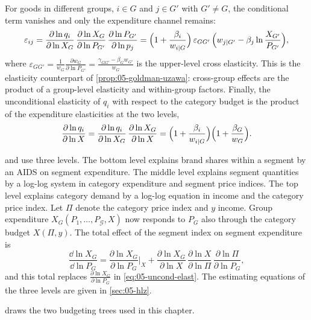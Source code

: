 For goods in different groups, $i \in G$ and $j \in G'$ with $G' \neq G$, the conditional term vanishes
and only the expenditure channel remains:
\begin{equation}\label{eq:05-uncond-cross}
  \varepsilon_{ij} = \frac{\partial\ln q_i}{\partial\ln X_G}\,\frac{\partial\ln X_G}{\partial\ln P_{G'}}\,
  \frac{\partial\ln P_{G'}}{\partial\ln p_j}
  = \Bigl(1 + \frac{\beta_i}{w_{i|G}}\Bigr)\,\varepsilon_{GG'}\,
    \Bigl(w_{j|G'} - \beta_j\ln\frac{X_{G'}}{P_{G'}}\Bigr),
\end{equation}
where $\varepsilon_{GG'} = \frac{1}{w_G}\frac{\partial w_G}{\partial\ln P_{G'}} = \frac{\gamma_{GG'} -
\beta_G w_{G'}}{w_G}$ is the upper-level cross elasticity. This is the elasticity counterpart of
\cref{prop:05-goldman-uzawa}: cross-group effects are the product of a group-level elasticity and
within-group factors. Finally, the unconditional elasticity of $q_i$ with respect to the category budget
is the product of the expenditure elasticities at the two levels,
\begin{equation*}
  \frac{\partial\ln q_i}{\partial\ln X} = \frac{\partial\ln q_i}{\partial\ln X_G}\,
  \frac{\partial\ln X_G}{\partial\ln X} = \Bigl(1 + \frac{\beta_i}{w_{i|G}}\Bigr)
  \Bigl(1 + \frac{\beta_G}{w_G}\Bigr).
\end{equation*}

\citet{HausmanLeonardZona1994} and \citet{Hausman1997} use three levels. The bottom level explains brand
shares within a segment by an AIDS on segment expenditure. The middle level explains segment quantities
by a log-log system in category expenditure and segment price indices. The top level explains category
demand by a log-log equation in income and the category price index. Let
$\Pi$ denote the category price index and $y$ income. Group expenditure $X_G(P_1, \dots,
P_{\mathcal{G}}, X)$ now responds to $P_G$ also through the category budget $X(\Pi, y)$. The total effect
of the segment index on segment expenditure is
\begin{equation*}
  \frac{\dd\ln X_G}{\dd\ln P_G} = \frac{\partial\ln X_G}{\partial\ln P_G}\Big|_{X}
  + \frac{\partial\ln X_G}{\partial\ln X}\,\frac{\partial\ln X}{\partial\ln\Pi}\,
    \frac{\partial\ln\Pi}{\partial\ln P_G},
\end{equation*}
and this total replaces $\frac{\partial\ln X_G}{\partial\ln P_G}$ in \eqref{eq:05-uncond-elast}. The
estimating equations of the three levels are given in \cref{sec:05-hlz}.

 draws the two budgeting trees used in this chapter.

